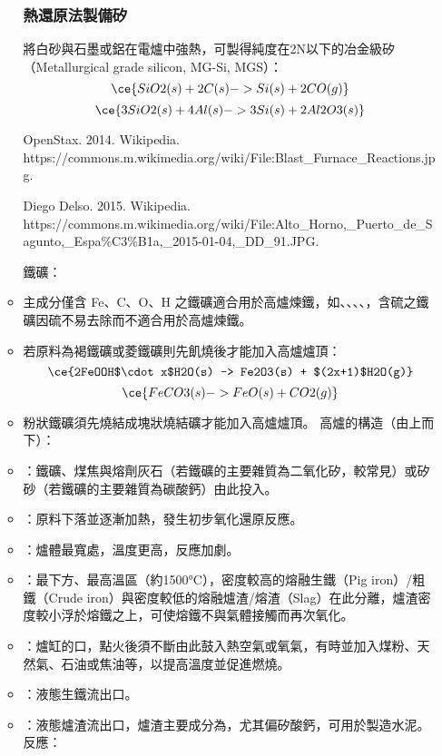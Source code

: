\documentclass[a4paper,12pt]{report}
\begin{document}
\begin{itemize}
\begin{itemize}
\subsubsection{熱還原法製備矽}
將白砂與石墨或鋁在電爐中強熱，可製得純度在2N以下的冶金級矽（Metallurgical grade silicon, MG-Si, MGS）：
\[\ce{SiO2(s) + 2C(s) -> Si(s) + 2CO(g)}\]
\[\ce{3SiO2(s) + 4Al(s) -> 3Si(s) + 2Al2O3(s)}\]
\bct\bfH\ctr{}\caption{OpenStax. 2014. Wikipedia. https://commons.m.wikimedia.org/wiki/File:Blast\_Furnace\_Reactions.jpg.}\ef\FB\ect
\bct\bfH\ctr{}\caption{Diego Delso. 2015. Wikipedia.\\https://commons.m.wikimedia.org/wiki/File:Alto\_Horno,\_Puerto\_de\_Sagunto,\_Espa\%C3\%B1a,\_2015-01-04,\_DD\_91.JPG.}\ef\FB\ect
鐵礦：
\bit
\item 主成分僅含 Fe、C、O、H 之鐵礦適合用於高爐煉鐵，如、、、、，含硫之鐵礦因硫不易去除而不適合用於高爐煉鐵。
\item 若原料為褐鐵礦或菱鐵礦則先飢燒後才能加入高爐爐頂：
\[\ce{2FeOOH$\cdot x$H2O(s) -> Fe2O3(s) + $(2x+1)$H2O(g)}\]
\[\ce{FeCO3(s) -> FeO(s) + CO2(g)}\]
\item 粉狀鐵礦須先燒結成塊狀燒結礦才能加入高爐爐頂。
\eit
高爐的構造（由上而下）：
\bit
\item {}：鐵礦、煤焦與熔劑灰石（若鐵礦的主要雜質為二氧化矽，較常見）或矽砂（若鐵礦的主要雜質為碳酸鈣）由此投入。
\item {}：原料下落並逐漸加熱，發生初步氧化還原反應。
\item {}：爐體最寬處，溫度更高，反應加劇。
\item {}：最下方、最高溫區（約1500°C），密度較高的熔融生鐵（Pig iron）/粗鐵（Crude iron）與密度較低的熔融爐渣/熔渣（Slag）在此分離，爐渣密度較小浮於熔鐵之上，可使熔鐵不與氣體接觸而再次氧化。
\item {}：爐缸的口，點火後須不斷由此鼓入熱空氣或氧氣，有時並加入煤粉、天然氣、石油或焦油等，以提高溫度並促進燃燒。
\item {}：液態生鐵流出口。
\item {}：液態爐渣流出口，爐渣主要成分為，尤其偏矽酸鈣，可用於製造水泥。
\eit
反應：
\bit

\end{itemize}
\end{itemize}
\end{document}
